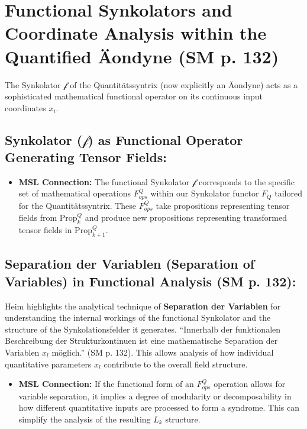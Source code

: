 \documentclass[
    12pt,              %
    a4paper,           %
    headings=normal,   %
    twoside=true,      %
    BCOR=8mm,          %
]{scrbook}
\newcommand{\q}[1]{\enquote{#1}}
\newcommand{\funktionaloperator}{\mathcal{f}}
\newcommand{\Propk}[1]{\text{Prop}_{#1}}
\begin{document}
\section{Functional Synkolators and Coordinate Analysis within the Quantified Äondyne (SM p. 132)}
\label{sec:ch8_2_functional_synkolators}

The Synkolator \(\funktionaloperator\) of the Quantitätssyntrix (now explicitly an Äondyne) acts as a sophisticated mathematical functional operator on its continuous input coordinates \(x_i\).

\subsection{Synkolator (\(\funktionaloperator\)) as Functional Operator Generating Tensor Fields:}
\label{sec:ch8_2_1_synk_as_func_op}
\begin{itemize}
    \item   \textbf{MSL Connection:} The functional Synkolator \(\funktionaloperator\) corresponds to the specific set of mathematical operations \(F_{ops}^Q\) within our Synkolator functor \(F_Q\) tailored for the Quantitätssyntrix. These \(F_{ops}^Q\) take propositions representing tensor fields from \(\Propk{k}^Q\) and produce new propositions representing transformed tensor fields in \(\Propk{k+1}^Q\).
\end{itemize}

\subsection{Separation der Variablen (Separation of Variables) in Functional Analysis (SM p. 132):}
\label{sec:ch8_2_2_separation_variables}
Heim highlights the analytical technique of \textbf{Separation der Variablen} for understanding the internal workings of the functional Synkolator and the structure of the Synkolationsfelder it generates. \q{Innerhalb der funktionalen Beschreibung der Strukturkontinuen ist eine mathematische Separation der Variablen \(x_l\) möglich.} (SM p. 132). This allows analysis of how individual quantitative parameters \(x_l\) contribute to the overall field structure.
\begin{itemize}
    \item   \textbf{MSL Connection:} If the functional form of an \(F_{ops}^Q\) operation allows for variable separation, it implies a degree of modularity or decomposability in how different quantitative inputs are processed to form a syndrome. This can simplify the analysis of the resulting \(L_k\) structure.
\end{itemize}
\end{document}
